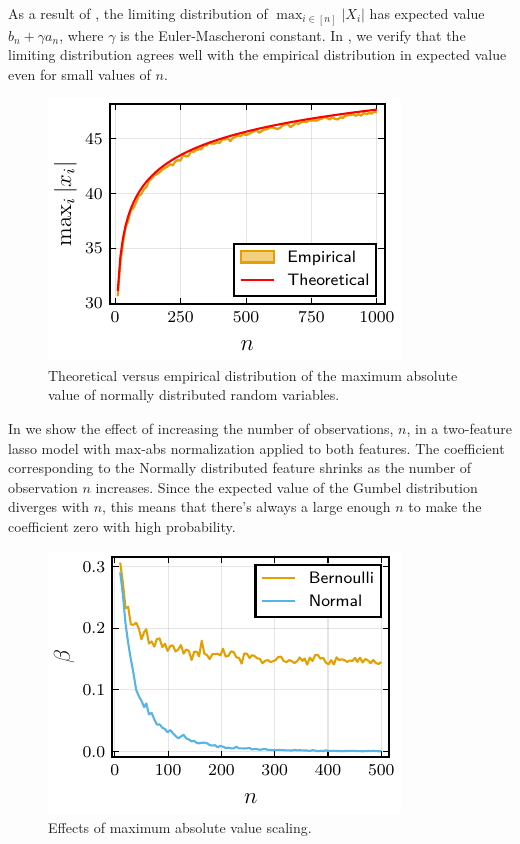 As a result of , the limiting distribution of \(\max_{i \in [n]}|X_i|\) has expected value \(b_n + \gamma a_n\), where \(\gamma\) is the Euler-Mascheroni constant. In , we verify that the limiting distribution agrees well with the empirical distribution in expected value even for small values of \(n\).

\begin{figure}[htpb]
  \centering
  \includegraphics[]{plots/maxabs_gev.pdf}
  \caption{%
    Theoretical versus empirical distribution of the maximum absolute value of normally distributed random variables.
  }
  \label{fig:maxabs-gev}
\end{figure}

In  we show the effect of increasing the number of observations, \(n\), in a two-feature lasso model with max-abs normalization applied to both features. The coefficient corresponding to the Normally distributed feature shrinks as the number of observation \(n\) increases. Since the expected value of the Gumbel distribution diverges with \(n\), this means that there's always a large enough \(n\) to make the coefficient zero with high probability.

\begin{figure}[htpb]
  \centering
  \includegraphics[]{plots/maxabs_n.pdf}
  \caption{%
    Effects of maximum absolute value scaling.
  }
  \label{fig:maxabs-n}
\end{figure}


